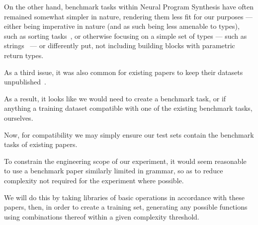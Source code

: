 \documentclass{article}
\begin{document}
On the other hand, benchmark tasks within Neural Program Synthesis have often remained somewhat simpler in nature,
rendering them less fit for our purposes --- either being imperative in nature (and as such being less amenable to types),
such as sorting tasks~\citep{npi,alphanpi},
or otherwise focusing on a simple set of types --- such as strings~\citep{nsps} ---%
or differently put, not including building blocks with parametric return types.

As a third issue, it was also common for existing papers to keep their datasets unpublished~\citep{nsps,deepcoder}.

As a result, it looks like we would need to create a benchmark task, or if anything a training dataset compatible with one of the existing benchmark tasks, ourselves.

Now, for compatibility we may simply ensure our test sets contain the benchmark tasks of existing papers.

To constrain the engineering scope of our experiment, it would seem reasonable to use a benchmark paper similarly limited in grammar, so as to reduce complexity not required for the experiment where possible.



We will do this by taking libraries of basic operations in accordance with these papers, then, in order to create a training set, generating any possible functions using combinations thereof within a given complexity threshold.
\end{document}

